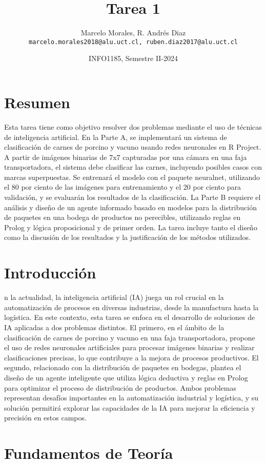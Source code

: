 \documentclass[12pt]{article}
\title{Tarea 1}
\author{Marcelo Morales, R. Andrés Diaz \\ \texttt{marcelo.morales2018@alu.uct.cl, ruben.diaz2017@alu.uct.cl}}
\date{INFO1185, Semestre II-2024}
\begin{document}
\maketitle

\section*{Resumen}
Esta tarea tiene como objetivo resolver dos problemas mediante el uso de técnicas de inteligencia artificial. En la Parte A, se implementará un sistema de clasificación de carnes de porcino y vacuno usando redes neuronales en R Project. A partir de imágenes binarias de 7x7 capturadas por una cámara en una faja transportadora, el sistema debe clasificar las carnes, incluyendo posibles casos con marcas superpuestas. Se entrenará el modelo con el paquete neuralnet, utilizando el 80 por ciento de las imágenes para entrenamiento y el 20 por ciento para validación, y se evaluarán los resultados de la clasificación. La Parte B requiere el análisis y diseño de un agente informado basado en modelos para la distribución de paquetes en una bodega de productos no perecibles, utilizando reglas en Prolog y lógica proposicional y de primer orden. La tarea incluye tanto el diseño como la discusión de los resultados y la justificación de los métodos utilizados.


\section{Introducción}
n la actualidad, la inteligencia artificial (IA) juega un rol crucial en la automatización de procesos en diversas industrias, desde la manufactura hasta la logística. En este contexto, esta tarea se enfoca en el desarrollo de soluciones de IA aplicadas a dos problemas distintos. El primero, en el ámbito de la clasificación de carnes de porcino y vacuno en una faja transportadora, propone el uso de redes neuronales artificiales para procesar imágenes binarias y realizar clasificaciones precisas, lo que contribuye a la mejora de procesos productivos. El segundo, relacionado con la distribución de paquetes en bodegas, plantea el diseño de un agente inteligente que utiliza lógica deductiva y reglas en Prolog para optimizar el proceso de distribución de productos. Ambos problemas representan desafíos importantes en la automatización industrial y logística, y su solución permitirá explorar las capacidades de la IA para mejorar la eficiencia y precisión en estos campos.


\section{Fundamentos de Teoría}
\end{document}
